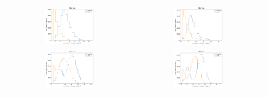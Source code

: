 \documentclass[preprintm,linenumbers]{aastex631}
\begin{document}
        \begin{figure}
			\centering
			\begin{tabular}{c c}
				\includegraphics[width=0.4\textwidth]{results/histograms/hist_first_year_one_snap_v4_0_10yrs_db_noDD_noTwi_CountMetric_doAllTemplateMetrics_reduceCount_u_28_noDD_noTwi.pdf} &
				 \includegraphics[width=0.4\textwidth]{results/histograms/hist_first_year_one_snap_v4_0_10yrs_db_noDD_noTwi_CountMetric_doAllTemplateMetrics_reduceCount_g_28_noDD_noTwi.pdf} \\
				 \includegraphics[width=0.4\textwidth]{results/histograms/hist_first_year_one_snap_v4_0_10yrs_db_noDD_noTwi_CountMetric_doAllTemplateMetrics_reduceCount_r_28_noDD_noTwi.pdf} &
				\includegraphics[width=0.4\textwidth]{results/histograms/hist_first_year_one_snap_v4_0_10yrs_db_noDD_noTwi_CountMetric_doAllTemplateMetrics_reduceCount_i_28_noDD_noTwi.pdf} \\

\end{tabular}
\end{figure}
\end{document}

